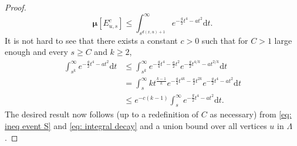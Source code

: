 \documentclass[10pt,a4paper]{amsart}
\begin{document}
\begin{proof}
\begin{equation}\label{eq: ineq event S}
\boldsymbol\mu[E_{u,s}^c]\leq \int_{s^{d(x,u)+1}}^\infty e^{-\frac{g}{2}t^4-at^2}\mathrm{d}t.
\end{equation}
It is not hard to see that there exists a constant $c>0$ such that for $C>1$ large enough and every $s\geq C$ and $k\geq 2$,
\begin{equation}\label{eq: integral decay}
\begin{aligned}
 \int_{s^k}^\infty e^{-\frac{g}{2}t^4-at^2}\mathrm{d}t &\leq  \int_{s^k}^\infty e^{-\frac{g}{4}t^4-\frac{a}{2}t^2}e^{-\frac{g}{2}t^{4/k}-at^{2/k}}\mathrm{d}t \\ 
 &=\int_{s}^\infty k t^{\frac{k-1}{k}} e^{-\frac{g}{4}t^{4k}-\frac{a}{2}t^{2k}}e^{-\frac{g}{2}t^{4}-at^{2}}\mathrm{d}t \\
 &\leq e^{-c(k-1)}\int_{s}^\infty e^{-\frac{g}{2}t^4-at^2}\mathrm{d}t.
 \end{aligned}
\end{equation}
The desired result now follows (up to a redefinition of $C$ as necessary) from \eqref{eq: ineq event S} and \eqref{eq: integral decay} and a union bound over all vertices $u$ in $\Lambda$.
\end{proof}
\end{document}
